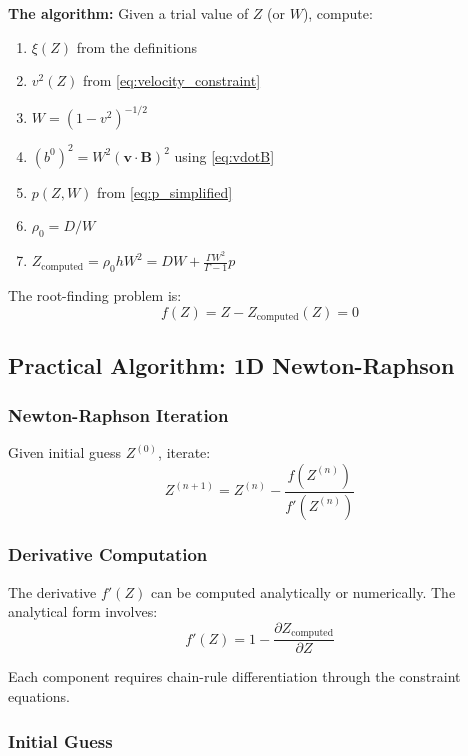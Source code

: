 \documentclass[12pt,a4paper]{article}
\begin{document}
\textbf{The algorithm:} Given a trial value of $Z$ (or $W$), compute:
\begin{enumerate}
    \item $\xi(Z)$ from the definitions
    \item $v^2(Z)$ from \eqref{eq:velocity_constraint}
    \item $W = (1 - v^2)^{-1/2}$
    \item $(b^0)^2 = W^2 (\bm{v} \cdot \bm{B})^2$ using \eqref{eq:vdotB}
    \item $p(Z, W)$ from \eqref{eq:p_simplified}
    \item $\rho_0 = D/W$
    \item $Z_\text{computed} = \rho_0 h W^2 = DW + \frac{\Gamma W^2}{\Gamma-1}p$
\end{enumerate}

The root-finding problem is:
\begin{equation}
\boxed{f(Z) = Z - Z_\text{computed}(Z) = 0}
\label{eq:root_finding_Z}
\end{equation}

\subsection{Practical Algorithm: 1D Newton-Raphson}

\subsubsection{Newton-Raphson Iteration}

Given initial guess $Z^{(0)}$, iterate:
\begin{equation}
Z^{(n+1)} = Z^{(n)} - \frac{f(Z^{(n)})}{f'(Z^{(n)})}
\label{eq:newton_raphson}
\end{equation}

\subsubsection{Derivative Computation}

The derivative $f'(Z)$ can be computed analytically or numerically. The analytical
form involves:
\begin{equation}
f'(Z) = 1 - \frac{\partial Z_\text{computed}}{\partial Z}
\end{equation}

Each component requires chain-rule differentiation through the constraint equations.

\subsubsection{Initial Guess}
\end{document}
